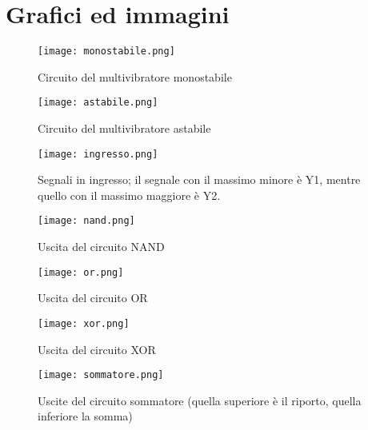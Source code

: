 \section{Grafici ed immagini}
\begin{figure}[h]
	\centering
	\texttt{[image: monostabile.png]}
	\caption{Circuito del multivibratore monostabile}
	\label{f:monostabile}
\end{figure}

\begin{figure}[h]
	\centering
	\texttt{[image: astabile.png]}
	\caption{Circuito del multivibratore astabile}
	\label{f:astabile}
\end{figure}

\begin{figure}[h]
	\centering
	\texttt{[image: ingresso.png]}
	\caption{Segnali in ingresso; il segnale con il massimo minore è Y1, mentre quello con il massimo maggiore è Y2.}
	\label{f:ingressi}
\end{figure}

\begin{figure}[h]
	\centering
	\texttt{[image: nand.png]}
	\caption{Uscita del circuito NAND}
	\label{f:NAND}
\end{figure}

\begin{figure}[h]
	\centering
	\texttt{[image: or.png]}
	\caption{Uscita del circuito OR}
	\label{f:OR}
\end{figure}

\begin{figure}[h]
	\centering
	\texttt{[image: xor.png]}
	\caption{Uscita del circuito XOR}
	\label{f:XOR}
\end{figure}

\begin{figure}[h]
	\centering
	\texttt{[image: sommatore.png]}
	\caption{Uscite del circuito sommatore (quella superiore è il riporto, quella inferiore la somma)}
	\label{f:Sommatore}
\end{figure}